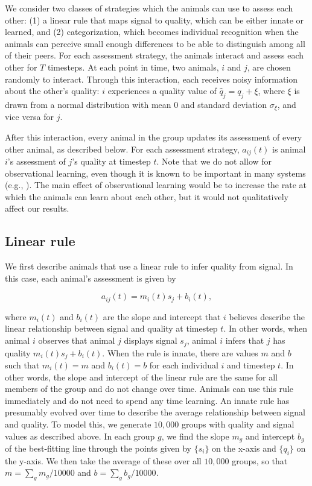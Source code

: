 We consider two classes of strategies which the animals can use to assess each other: (1) a linear rule that maps signal to quality, which can be either innate or learned, and (2) categorization, which becomes individual recognition when the animals can perceive small enough differences to be able to distinguish among all of their peers. For each assessment strategy, the animals interact and assess each other for $T$ timesteps. At each point in time, two animals, $i$ and $j$, are chosen randomly to interact. Through this interaction, each receives noisy information about the other's quality: $i$ experiences a quality value of $\hat{q}_j=q_j+\xi$, where $\xi$ is drawn from a normal distribution with mean $0$ and standard deviation $\sigma_\xi$, and vice versa for $j$. 

After this interaction, every animal in the group updates its assessment of every other animal, as described below. For each assessment strategy, $a_{ij}(t)$ is animal $i$'s assessment of $j$'s quality at timestep $t$. Note that we do not allow for observational learning, even though it is known to be important in many systems (e.g., \citep{Freeman:1985kl,Holekamp:1991nx,Schaik:2011oq,Hobson:2015uq,Seyfarth2015SocialCognition}). The main effect of observational learning would be to increase the rate at which the animals can learn about each other, but it would not qualitatively affect our results. 


\subsection*{Linear rule}
We first describe animals that use a linear rule to infer quality from signal. In this case, each animal's assessment is given by
\begin{linenomath*}
\begin{equation*}
a_{ij}(t)=m_i(t)s_j+b_i(t),
\end{equation*}
\end{linenomath*}
where $m_i(t)$ and $b_i(t)$ are the slope and intercept that $i$ believes describe the linear relationship between signal and quality at timestep $t$. In other words, when animal $i$ observes that animal $j$ displays signal $s_j$, animal $i$ infers that $j$ has quality $m_i(t)s_j+b_i(t)$. When the rule is innate, there are values $m$ and $b$ such that $m_i(t)=m$ and $b_i(t)=b$ for each individual $i$ and timestep $t$. In other words, the slope and intercept of the linear rule are the same for all members of the group and do not change over time. Animals can use this rule immediately and do not need to spend any time learning.  An innate rule has presumably evolved over time to describe the average relationship between signal and quality. To model this, we generate $10,000$ groups with quality and signal values as described above. In each group $g$, we find the slope $m_{g}$ and intercept $b_{g}$ of the best-fitting line through the points given by $\{s_i\}$ on the x-axis and $\{q_i\}$ on the y-axis. We then take the average of these over all $10,000$ groups, so that $m=\sum_{g} m_{g}/10000$ and $b=\sum_{g}b_{g}/10000$. 


